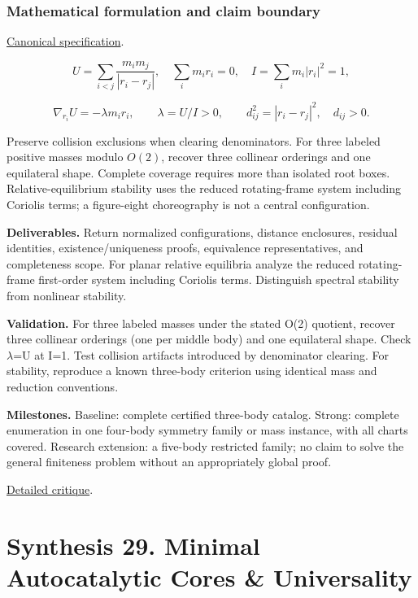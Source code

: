 \documentclass[
  11pt,
]{article}
\begin{document}
\subsubsection{Mathematical formulation and claim boundary}

\href{https://github.com/rick-stevens-ai/Pure-Thought/blob/main/PRDs/27-N-Body-Central-Configurations.md}{Canonical
specification}.

\[U=\sum_{i<j}\frac{m_im_j}{|r_i-r_j|},\quad
\sum_i m_i r_i=0,\quad I=\sum_i m_i|r_i|^2=1,\]

\[\nabla_{r_i}U=-\lambda m_i r_i,\qquad\lambda=U/I>0,
\qquad d_{ij}^2=|r_i-r_j|^2,\quad d_{ij}>0.\]

Preserve collision exclusions when clearing denominators. For three
labeled positive masses modulo \(O(2)\), recover three collinear
orderings and one equilateral shape. Complete coverage requires more
than isolated root boxes. Relative-equilibrium stability uses the
reduced rotating-frame system including Coriolis terms; a figure-eight
choreography is not a central configuration.

\textbf{Deliverables.} Return normalized configurations, distance
enclosures, residual identities, existence/uniqueness proofs,
equivalence representatives, and completeness scope. For planar relative
equilibria analyze the reduced rotating-frame first-order system
including Coriolis terms. Distinguish spectral stability from nonlinear
stability.

\textbf{Validation.} For three labeled masses under the stated O(2)
quotient, recover three collinear orderings (one per middle body) and
one equilateral shape. Check \ensuremath{\lambda}=U at I=1. Test
collision artifacts introduced by denominator clearing. For stability,
reproduce a known three-body criterion using identical mass and
reduction conventions.

\textbf{Milestones.} Baseline: complete certified three-body catalog.
Strong: complete enumeration in one four-body symmetry family or mass
instance, with all charts covered. Research extension: a five-body
restricted family; no claim to solve the general finiteness problem
without an appropriately global proof.

\href{https://github.com/rick-stevens-ai/Pure-Thought/blob/main/reviews/27-N-Body-Central-Configurations.md}{Detailed
critique}.

\section{Synthesis 29. Minimal Autocatalytic Cores \& Universality}
\end{document}
